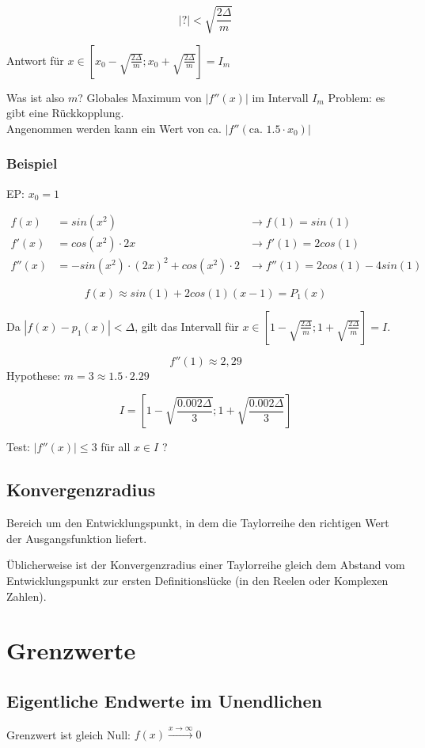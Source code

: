 \[
	|?| < \sqrt{\frac{2 \Delta}{m}}
\]

Antwort für $x \in \left[ x_0 - \sqrt{\frac{2 \Delta}{m}}; x_0 + \sqrt{\frac{2 \Delta}{m}} \right] = I_m$

Was ist also $m$? Globales Maximum von $|f''(x)|$ im Intervall $I_m$
Problem: es gibt eine Rückkopplung. \\
Angenommen werden kann ein Wert von ca. $|f''(\text{ca. } 1.5 \cdot x_0)|$


\subsubsection{Beispiel}
	EP: $x_0 = 1$
	
\begin{align*}
	f(x) &= sin(x^2) &\rightarrow f(1) = sin(1) \\
	f'(x) &= cos(x^2) \cdot 2x &\rightarrow f'(1) = 2 cos(1) \\
	f''(x) &= -sin(x^2) \cdot (2x)^2 + cos(x^2) \cdot 2 &\rightarrow f''(1) = 2 cos(1) - 4 sin(1)
\end{align*}

\[
	f(x) \approx sin(1) + 2 cos(1) (x-1) = P_1(x) 
\]

Da $|f(x) - p_1(x)| < \Delta$, gilt das Intervall für $x \in \left[1-\sqrt{\frac{2 \Delta}{m}}; 1+\sqrt{\frac{2 \Delta}{m}} \right] = I$.

\[
	f''(1) \approx 2,29
\]
Hypothese: $m=3 \approx 1.5 \cdot 2.29$

\[
	I = \left[1-\sqrt{\frac{0.002 \Delta}{3}}; 1+\sqrt{\frac{0.002 \Delta}{3}} \right]
\]

Test: $|f''(x)| \leq 3$ für all $x \in I$ ?

\subsection{Konvergenzradius}

Bereich um den Entwicklungspunkt, in dem die Taylorreihe den richtigen Wert der Ausgangsfunktion liefert.

Üblicherweise ist der Konvergenzradius einer Taylorreihe gleich dem Abstand vom Entwicklungspunkt zur ersten Definitionslücke (in den Reelen oder Komplexen Zahlen).

\section{Grenzwerte}

\subsection{Eigentliche Endwerte im Unendlichen}
Grenzwert ist gleich Null: $f(x) \xrightarrow{x \rightarrow \infty} 0$

